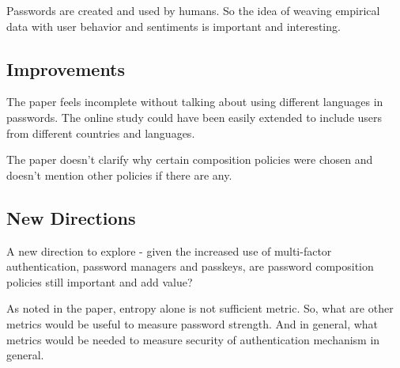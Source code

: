 \documentclass[12pt]{article}
\begin{document}
    Passwords are created and used by humans. So the idea of weaving empirical data with user behavior and sentiments is important and interesting.

    \subsection*{Improvements}
    The paper feels incomplete without talking about using different languages in passwords. The online study could have been easily extended to include users from different countries and languages.

    The paper doesn't clarify why certain composition policies were chosen and doesn't mention other policies if there are any.

    \subsection*{New Directions}
    A new direction to explore - given the increased use of multi-factor authentication, password managers and passkeys, are password composition policies still important and add value?

    As noted in the paper, entropy alone is not sufficient metric. So, what are other metrics would be useful to measure password strength. And in general, what metrics would be needed to measure security of authentication mechanism in general.
\end{document}
